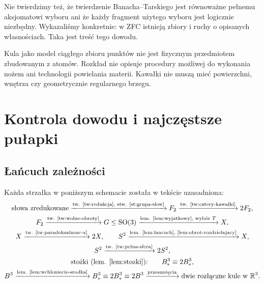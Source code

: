 \documentclass[11pt,a4paper]{article}
\numberwithin{equation}{section}
\theoremstyle{plain}
\theoremstyle{definition}
\theoremstyle{remark}
\newcommand{\R}{\mathbb R}
\begin{document}
Nie twierdzimy też, że twierdzenie Banacha--Tarskiego jest równoważne pełnemu aksjomatowi wyboru ani że każdy fragment użytego wyboru jest logicznie niezbędny. Wykazaliśmy konkretnie: w ZFC istnieją zbiory i ruchy o opisanych własnościach. Taka jest treść tego dowodu.

Kula jako model ciągłego zbioru punktów nie jest fizycznym przedmiotem zbudowanym z atomów. Rozkład nie opisuje procedury możliwej do wykonania nożem ani technologii powielania materii. Kawałki nie muszą mieć powierzchni, wnętrza czy geometrycznie regularnego brzegu.

\section{Kontrola dowodu i najczęstsze pułapki}
\subsection{Łańcuch zależności}
Każda strzałka w poniższym schemacie została w tekście uzasadniona:
\[
\begin{gathered}
\text{słowa zredukowane}\xrightarrow{\text{tw. \ref{tw:redukcja}, stw. \ref{st:grupa-slow}}}F_2
\xrightarrow{\text{tw. \ref{tw:cztery-kawalki}}}2F_2,\\
F_2\xrightarrow{\text{tw. \ref{tw:wolne-obroty}}}G\le\mathrm{SO}(3)
\xrightarrow{\text{lem. \ref{lem:wyjatkowy}, wybór }T}X,\\
X\xrightarrow{\text{tw. \ref{tw:paradoksalnosc-x}}}2X,
\qquad S^2\xrightarrow{\text{lem. \ref{lem:lancuch}, \ref{lem:obrot-rozdzielajacy}}}X,\\
S^2\xrightarrow{\text{tw. \ref{tw:pelna-sfera}}}2S^2,\\
\text{stożki (lem. \ref{lem:stozki}):}\qquad B^3_*\equiv2B^3_*,\\
B^3\xrightarrow{\text{lem. \ref{lem:wchloniecie-srodka}}}B^3_*
\equiv2B^3_*\equiv2B^3
\xrightarrow{\text{przesunięcia}}\text{dwie rozłączne kule w }\R^3.
\end{gathered}
\]
\end{document}
